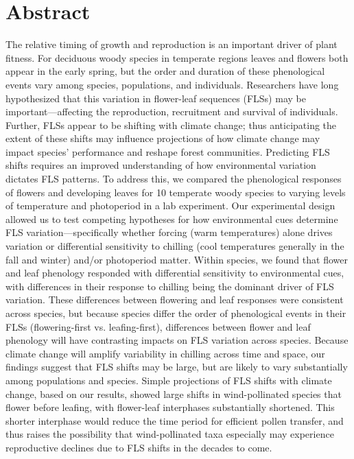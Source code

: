 \documentclass[12pt]{article}\usepackage[]{graphicx}\usepackage[]{color}
\begin{document}
\section*{Abstract} 
The relative timing of growth and reproduction is an important driver of plant fitness. For deciduous woody species in temperate regions leaves and flowers both appear in the early spring, but the order and duration of these phenological events vary among species, populations, and individuals.  Researchers have long hypothesized that this variation in flower-leaf sequences (FLSs) may be important---affecting the reproduction, recruitment and survival of individuals. Further,  FLSs appear to be shifting with climate change; thus anticipating the extent of these shifts may influence projections of how climate change may impact species' performance and reshape forest communities. Predicting FLS shifts requires an improved understanding of how environmental variation dictates FLS patterns. To address this, we compared the phenological responses of flowers and developing leaves for 10 temperate woody species to varying levels of temperature and photoperiod in a lab experiment. Our experimental design allowed us to test competing hypotheses for how environmental cues determine FLS variation---specifically whether forcing (warm temperatures) alone drives variation or differential sensitivity to chilling (cool temperatures generally in the fall and winter) and/or photoperiod matter. Within species, we found that flower and leaf phenology responded with differential sensitivity to environmental cues, with differences in their response to chilling being the dominant driver of FLS variation. These differences between flowering and leaf responses were consistent across species, but because species differ the order of phenological events in their FLSs (flowering-first vs. leafing-first), differences between flower and leaf phenology will have contrasting impacts on FLS variation across species. Because climate change will amplify variability in chilling across time and space, our findings suggest that FLS shifts may be large, but are likely to vary substantially among populations and species. Simple projections of FLS shifts with climate change, based on our results, showed large shifts in wind-pollinated species that flower before leafing, with flower-leaf interphases substantially shortened. This shorter interphase would reduce the time period for efficient
pollen transfer, and thus raises the possibility that wind-pollinated
taxa especially may experience reproductive declines due to FLS shifts
in the decades to come.
\end{document}
